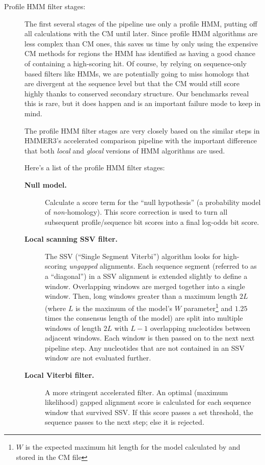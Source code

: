 \begin{description}
\item[Profile HMM filter stages:] The first several stages of the
  pipeline use only a profile HMM, putting off all calculations with
  the CM until later. Since profile HMM algorithms are less complex
  than CM ones, this saves us time by only using the expensive CM
  methods for regions the HMM has identified as having a good chance
  of containing a high-scoring hit. Of course, by relying on
  sequence-only based filters like HMMs, we are potentially going to
  miss homologs that are divergent at the sequence level but that the
  CM would still score highly thanks to conserved secondary
  structure. Our benchmarks reveal this is rare, but it does happen
  and is an important failure mode to keep in mind.

  The profile HMM filter stages are very closely based on the similar
  steps in HMMER3's accelerated comparison pipeline with the important
  difference that both \emph{local} and \emph{glocal} versions of HMM
  algorithms are used.

  Here's a list of the profile HMM filter stages:
\begin{description}
\item[\textbf{Null model.}] Calculate a score term for the ``null
  hypothesis'' (a probability model of \emph{non-}homology). This
  score correction is used to turn all subsequent profile/sequence bit
  scores into a final log-odds bit score.
  
\item[\textbf{Local scanning SSV filter.}] The SSV (``Single Segment
  Viterbi'') algorithm looks for high-scoring \emph{ungapped}
  alignments. Each sequence segment (referred to as a ``diagonal'') in
  a SSV alignment is extended slightly to define a window. Overlapping
  windows are merged together into a single window. Then, long windows
  greater than a maximum length $2L$ (where $L$ is the maximum of the
  model's $W$ parameter\footnote{$W$ is the expected maximum hit
  length for the model calculated by  and stored in the
  CM file} and $1.25$ times the consensus length of the model) are
  split into multiple windows of length $2L$ with $L-1$ overlapping
  nucleotides between adjacent windows. Each window is then passed on
  to the next next pipeline step. Any nucleotides that are not
  contained in an SSV window are not evaluated further.

\item[\textbf{Local Viterbi filter.}] A more stringent accelerated
  filter. An optimal (maximum likelihood) gapped alignment score is
  calculated for each sequence window that survived SSV. If this score
  passes a set threshold, the sequence passes to the next step; else
  it is rejected.


\end{description}
\end{description}
